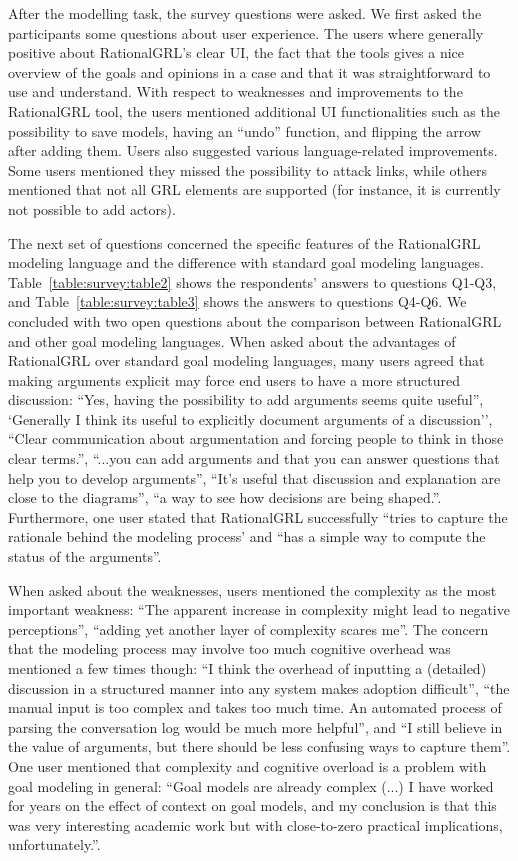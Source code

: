 After the modelling task, the survey questions were asked. We first asked the participants some questions about user experience. The users where generally positive about RationalGRL's clear UI, the fact that the tools gives a nice overview of the goals and opinions in a case and that it was straightforward to use and understand. With respect to weaknesses and improvements to the RationalGRL tool, the users mentioned additional UI functionalities such as the possibility to save models, having an ``undo'' function, and flipping the arrow after adding them. Users also suggested various language-related improvements. Some users mentioned they missed the possibility to attack links, while others mentioned that not all GRL elements are supported (for instance, it is currently not possible to add actors). 

The next set of questions concerned the specific features of the RationalGRL modeling language and the difference with standard goal modeling languages. Table~\ref{table:survey:table2} shows the respondents' answers to questions Q1-Q3, and Table~\ref{table:survey:table3} shows the answers to questions Q4-Q6. We concluded with two open questions about the comparison between RationalGRL and other goal modeling languages. When asked about the advantages of RationalGRL over standard goal modeling languages, many users agreed that making arguments explicit may force end users to have a more structured discussion:  ``Yes, having the possibility to add arguments seems quite useful'', `Generally I think its useful to explicitly document arguments of a discussion'', ``Clear communication about argumentation and forcing people to think in those clear terms.'', ``...you can add arguments and that you can answer questions that help you to develop arguments'', ``It's useful that discussion and explanation are close to the diagrams'', ``a way to see how decisions are being shaped.''. Furthermore, one user stated that RationalGRL successfully ``tries to capture the rationale behind the modeling process' and ``has a simple way to compute the status of the arguments''. 

When asked about the weaknesses, users mentioned the complexity as the most important weakness: ``The apparent increase in complexity might lead to negative perceptions'', ``adding yet another layer of complexity scares me''. The concern that the modeling process may involve too much cognitive overhead was mentioned a few times though: ``I think the overhead of inputting a (detailed) discussion in a structured manner into any system makes adoption difficult'', ``the manual input is too complex and takes too much time. An automated process of parsing the conversation log would be much more helpful'', and ``I still believe in the value of arguments, but there should be less confusing ways to capture them''. One user mentioned that complexity and cognitive overload is a problem with goal modeling in general: ``Goal models are already complex (...) I have worked for years on the effect of context on goal models, and my conclusion is that this was very interesting academic work but with close-to-zero practical implications, unfortunately.''.

